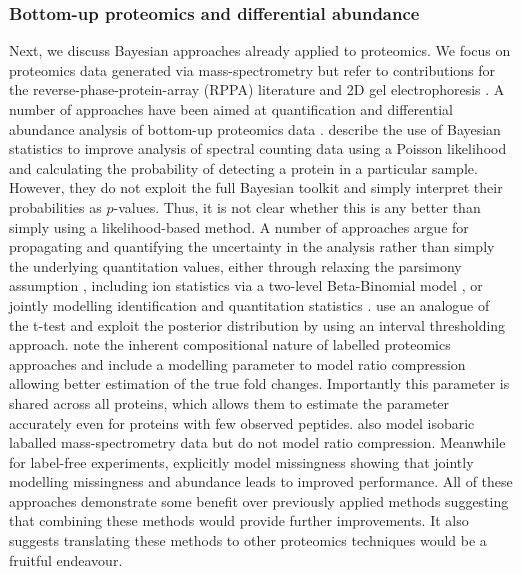 \documentclass[12pt,english, journal=jpr, layout=twocolumn]{article}
\begin{document}
\subsubsection{Bottom-up proteomics and differential abundance}
Next, we discuss Bayesian approaches already applied to proteomics. We focus on proteomics data generated via mass-spectrometry but refer to contributions for the reverse-phase-protein-array (RPPA) literature \citep{Crook::2019, Ni::2019, Maity::2020} and 2D gel electrophoresis \citep{Morris::2011}. A number of approaches have been aimed at quantification and differential abundance analysis of bottom-up proteomics data \citep{Phillips::2021, The::2021, The::2019, Santra::2016, Peshkin::2019, Millikin::2020, Serang::2013, OBrien::2018, Serang::2012, Carvalho::2011}. \citet{Carvalho::2011} describe the use of Bayesian statistics to improve analysis of spectral counting data using a Poisson likelihood and calculating the probability of detecting a protein in a particular sample. However, they do not exploit the full Bayesian toolkit and simply interpret their probabilities as $p$-values. Thus, it is not clear whether this is any better than simply using a likelihood-based method. A number of approaches \citep{The::2021, The::2019, Peshkin::2019, Serang::2012} argue for propagating and quantifying the uncertainty in the analysis rather than simply the underlying quantitation values, either through relaxing the parsimony assumption \citep{Serang::2012}, including ion statistics via a two-level Beta-Binomial model \citep{Peshkin::2019}, or jointly modelling identification and quantitation statistics \citep{The::2019, The::2021}. \citet{Millikin::2020} use an analogue of the t-test and exploit the posterior distribution by using an interval thresholding approach. \citet{OBrien::2018} note the inherent compositional nature of labelled proteomics approaches and include a modelling parameter to model ratio compression allowing better estimation of the true fold changes. Importantly this parameter is shared across all proteins, which allows them to estimate the parameter accurately even for proteins with few observed peptides. \citet{Jow::2014} also model isobaric laballed mass-spectrometry data but do not model ratio compression. Meanwhile for label-free experiments, \citet{OBrien::2018b} explicitly model missingness showing that jointly modelling missingness and abundance leads to improved performance. All of these approaches demonstrate some benefit over previously applied methods suggesting that combining these methods would provide further improvements. It also suggests translating these methods to other proteomics techniques would be a fruitful endeavour.
\end{document}
